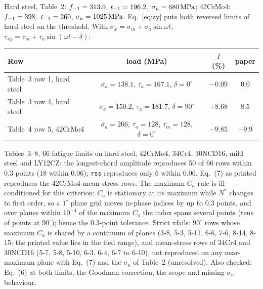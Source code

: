  Hard steel, Table~2: $f_{-1}=313.9$, $t_{-1}=196.2$, $\sigma_u=680\,\mathrm{MPa}$; 42CrMo4:
$f_{-1}=398$, $t_{-1}=260$, $\sigma_u=1025\,\mathrm{MPa}$. Eq.~\eqref{eq:zy} puts both reversed limits of hard steel on
the threshold. With $\sigma_x=\sigma_m+\sigma_a\sin\omega t$,
$\tau_{xy}=\tau_m+\tau_a\sin(\omega t-\delta)$:
\begin{center}\small
\begin{tabular}{@{}lccc@{}}
\toprule
Row & load (MPa) & $I$ (\%) & paper\\\midrule
Table~3 row 1, hard steel & $\sigma_a=138.1$, $\tau_a=167.1$, $\delta=0^\circ$ & $-0.09$ & 0.0\\
Table~3 row 4, hard steel & $\sigma_a=150.2$, $\tau_a=181.7$, $\delta=90^\circ$ & $+8.68$ & 8.5\\
Table~4 row 5, 42CrMo4 & $\sigma_a=266$, $\tau_a=128$, $\tau_m=128$, $\delta=0^\circ$ & $-9.85$ & $-9.9$\\
\bottomrule
\end{tabular}
\end{center}

 Tables~3--8, 66 fatigue limits on hard steel, 42CrMo4, 34Cr4, 30NCD16, mild steel
and LY12CZ: the longest-chord amplitude reproduces 50 of 66 rows within 0.3 points (18 within 0.06);
\texttt{rss} reproduces only 6 within 0.06. Eq.~(7) as printed reproduces the 42CrMo4 mean-stress
rows. The maximum-$C_a$ rule is ill-conditioned for this criterion: $C_a$ is stationary at its maximum
while $N^*$ changes to first order, so a $1^\circ$ plane grid moves in-phase indices by up to 0.3
points, and over planes within $10^{-4}$ of the maximum $C_a$ the index spans several points (tens of
points at $90^\circ$); hence the 0.3-point tolerance. Strict xfails: $90^\circ$ rows whose maximum
$C_a$ is shared by a continuum of planes (3-8, 5-3, 5-11, 6-6, 7-6, 8-14, 8-15; the printed value lies
in the tied range), and mean-stress rows of 34Cr4 and 30NCD16 (5-7, 5-8, 5-10, 6-3, 6-4, 6-7 to 6-10),
not reproduced on any near-maximum plane with Eq.~(7) and the $\sigma_u$ of Table~2 (unresolved). Also
checked: Eq.~(6) at both limits, the Goodman correction, the scope and missing-$\sigma_u$ behaviour.
